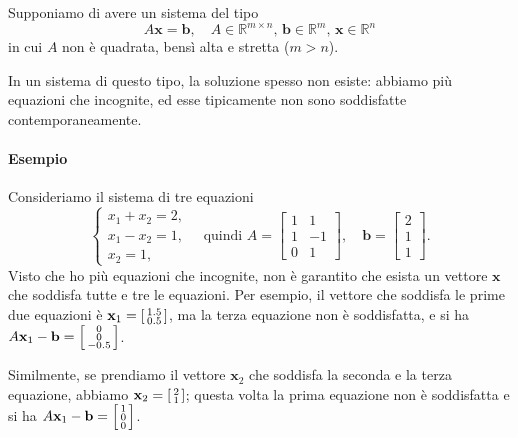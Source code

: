 \documentclass[a4paper]{report}
\theoremstyle{definiton}
\theoremstyle{remark}
\newcommand{\x}{\mathbf{x}}
\renewcommand{\b}{\mathbf{b}}
\begin{document}
Supponiamo di avere un sistema del tipo
\[
A\x = \b, \quad A \in \mathbb{R}^{m\times n}, \, \b\in\mathbb{R}^m, \, \x\in\mathbb{R}^n
\]
in cui $A$ non è quadrata, bensì alta e stretta ($m>n$).

In un sistema di questo tipo, la soluzione spesso non esiste: abbiamo più equazioni che incognite, ed esse tipicamente non sono soddisfatte contemporaneamente. 

\paragraph{Esempio} Consideriamo il sistema di tre equazioni
\begin{equation} \label{esminquadrati}
\begin{cases}
    x_1 + x_2 = 2,\\
    x_1 - x_2 = 1,\\
    x_2 = 1,
\end{cases} \quad \text{quindi } A = \begin{bmatrix}
    1 & 1\\
    1 & -1\\
    0 & 1
\end{bmatrix}, \quad \b = \begin{bmatrix}
    2\\1\\1
\end{bmatrix}.
\end{equation}
Visto che ho più equazioni che incognite, non è garantito che esista un vettore $\x$ che soddisfa tutte e tre le equazioni. Per esempio, il vettore che soddisfa le prime due equazioni è $\x_1 = \begin{bsmallmatrix}1.5\\0.5\end{bsmallmatrix}$, ma la terza equazione non è soddisfatta, e si ha $A\x_1 - \b = \begin{bsmallmatrix}0\\0\\-0.5\end{bsmallmatrix}$.

Similmente, se prendiamo il vettore $\x_2$ che soddisfa la seconda e la terza equazione, abbiamo $\x_2 = \begin{bsmallmatrix}2\\1\end{bsmallmatrix}$; questa volta la prima equazione non è soddisfatta e si ha $A\x_1 - \b = \begin{bsmallmatrix}1\\0\\0\end{bsmallmatrix}$.
\end{document}
